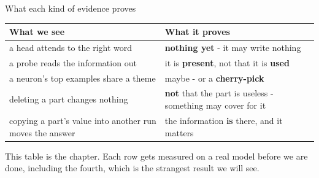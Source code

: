 \documentclass[aspectratio=169]{beamer}
\newcommand{\takebox}[1]{%
  \begin{tcolorbox}[colback=paramgreen!8, colframe=paramgreen, boxrule=0.6pt, arc=2pt]
  #1
  \end{tcolorbox}}
\begin{document}
\begin{frame}{What each kind of evidence proves}
  \vspace{0.5em}
  \begin{center}
  \small
  \begin{tabular}{@{}>{\raggedright\arraybackslash}p{}>{\raggedright\arraybackslash}p{}@{}}
    \toprule
    \textbf{What we see} & \textbf{What it proves}\\
    \midrule
    a head attends to the right word & \textbf{nothing yet} - it may write nothing\\[0.3em]
    a probe reads the information out & it is \textbf{present}, not that it is \textbf{used}\\[0.3em]
    a neuron's top examples share a theme & maybe - or a \textbf{cherry-pick}\\[0.3em]
    deleting a part changes nothing & \textbf{not} that the part is useless - something may cover
      for it\\[0.3em]
    copying a part's value into another run moves the answer & the information \textbf{is} there,
      and it matters\\
    \bottomrule
  \end{tabular}
  \end{center}

  \vspace{0.7em}
  \takebox{This table is the chapter. Each row gets measured on a real model before we are done,
  including the fourth, which is the strangest result we will see.}
\end{frame}
\end{document}
